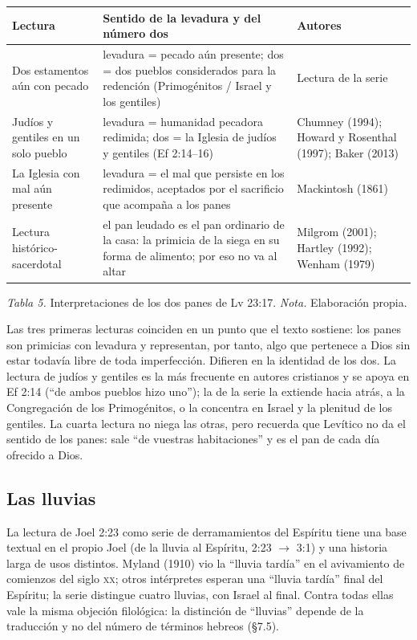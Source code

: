 \documentclass[11pt,letterpaper]{article}
\begin{document}
\begin{center}\small\renewcommand{\arraystretch}{1.22}
\begin{tabular}{@{}L{3.4cm}L{6.4cm}L{5.6cm}@{}}
\toprule
\textbf{Lectura} & \textbf{Sentido de la levadura y del número dos} & \textbf{Autores} \\ \midrule
Dos estamentos aún con pecado & levadura = pecado aún presente; dos = dos pueblos considerados para la redención (Primogénitos / Israel y los gentiles) & Lectura de la serie \\
Judíos y gentiles en un solo pueblo & levadura = humanidad pecadora redimida; dos = la Iglesia de judíos y gentiles (Ef 2:14--16) & Chumney (1994); Howard y Rosenthal (1997); Baker (2013) \\
La Iglesia con mal aún presente & levadura = el mal que persiste en los redimidos, aceptados por el sacrificio que acompaña a los panes & Mackintosh (1861) \\
Lectura histórico-sacerdotal & el pan leudado es el pan ordinario de la casa: la primicia de la siega en su forma de alimento; por eso no va al altar & Milgrom (2001); Hartley (1992); Wenham (1979) \\
\bottomrule
\end{tabular}\par
{\footnotesize\color{sepia}\textit{Tabla 5.} Interpretaciones de los dos panes de Lv 23:17. \textit{Nota.} Elaboración propia.}
\end{center}

Las tres primeras lecturas coinciden en un punto que el texto sostiene: los panes son primicias con levadura y representan, por tanto, algo que pertenece a Dios sin estar todavía libre de toda imperfección. Difieren en la identidad de los dos. La lectura de judíos y gentiles es la más frecuente en autores cristianos y se apoya en Ef 2:14 (``de ambos pueblos hizo uno''); la de la serie la extiende hacia atrás, a la Congregación de los Primogénitos, o la concentra en Israel y la plenitud de los gentiles. La cuarta lectura no niega las otras, pero recuerda que Levítico no da el sentido de los panes: sale ``de vuestras habitaciones'' y es el pan de cada día ofrecido a Dios.

\subsection{Las lluvias}

La lectura de Joel 2:23 como serie de derramamientos del Espíritu tiene una base textual en el propio Joel (de la lluvia al Espíritu, 2:23 $\rightarrow$ 3:1) y una historia larga de usos distintos. Myland (1910) vio la ``lluvia tardía'' en el avivamiento de comienzos del siglo \textsc{xx}; otros intérpretes esperan una ``lluvia tardía'' final del Espíritu; la serie distingue cuatro lluvias, con Israel al final. Contra todas ellas vale la misma objeción filológica: la distinción de ``lluvias'' depende de la traducción y no del número de términos hebreos (§7.5).
\end{document}

